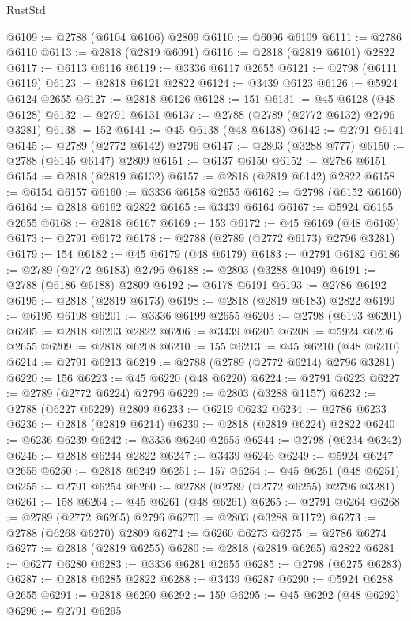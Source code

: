 \begin{lexlean}{RustStd}
\begin{coremodule}
@6109 := @2788 (@6104 @6106) @2809
@6110 := @6096 @6109
@6111 := @2786 @6110
@6113 := @2818 (@2819 @6091)
@6116 := @2818 (@2819 @6101) @2822
@6117 := @6113 @6116
@6119 := @3336 @6117 @2655
@6121 := @2798 (@6111 @6119)
@6123 := @2818 @6121 @2822
@6124 := @3439 @6123
@6126 := @5924 @6124 @2655
@6127 := @2818 @6126
@6128 := 151
@6131 := @45 @6128 (@48 @6128)
@6132 := @2791 @6131
@6137 := @2788 (@2789 (@2772 @6132) @2796 @3281)
@6138 := 152
@6141 := @45 @6138 (@48 @6138)
@6142 := @2791 @6141
@6145 := @2789 (@2772 @6142) @2796
@6147 := @2803 (@3288 @777)
@6150 := @2788 (@6145 @6147) @2809
@6151 := @6137 @6150
@6152 := @2786 @6151
@6154 := @2818 (@2819 @6132)
@6157 := @2818 (@2819 @6142) @2822
@6158 := @6154 @6157
@6160 := @3336 @6158 @2655
@6162 := @2798 (@6152 @6160)
@6164 := @2818 @6162 @2822
@6165 := @3439 @6164
@6167 := @5924 @6165 @2655
@6168 := @2818 @6167
@6169 := 153
@6172 := @45 @6169 (@48 @6169)
@6173 := @2791 @6172
@6178 := @2788 (@2789 (@2772 @6173) @2796 @3281)
@6179 := 154
@6182 := @45 @6179 (@48 @6179)
@6183 := @2791 @6182
@6186 := @2789 (@2772 @6183) @2796
@6188 := @2803 (@3288 @1049)
@6191 := @2788 (@6186 @6188) @2809
@6192 := @6178 @6191
@6193 := @2786 @6192
@6195 := @2818 (@2819 @6173)
@6198 := @2818 (@2819 @6183) @2822
@6199 := @6195 @6198
@6201 := @3336 @6199 @2655
@6203 := @2798 (@6193 @6201)
@6205 := @2818 @6203 @2822
@6206 := @3439 @6205
@6208 := @5924 @6206 @2655
@6209 := @2818 @6208
@6210 := 155
@6213 := @45 @6210 (@48 @6210)
@6214 := @2791 @6213
@6219 := @2788 (@2789 (@2772 @6214) @2796 @3281)
@6220 := 156
@6223 := @45 @6220 (@48 @6220)
@6224 := @2791 @6223
@6227 := @2789 (@2772 @6224) @2796
@6229 := @2803 (@3288 @1157)
@6232 := @2788 (@6227 @6229) @2809
@6233 := @6219 @6232
@6234 := @2786 @6233
@6236 := @2818 (@2819 @6214)
@6239 := @2818 (@2819 @6224) @2822
@6240 := @6236 @6239
@6242 := @3336 @6240 @2655
@6244 := @2798 (@6234 @6242)
@6246 := @2818 @6244 @2822
@6247 := @3439 @6246
@6249 := @5924 @6247 @2655
@6250 := @2818 @6249
@6251 := 157
@6254 := @45 @6251 (@48 @6251)
@6255 := @2791 @6254
@6260 := @2788 (@2789 (@2772 @6255) @2796 @3281)
@6261 := 158
@6264 := @45 @6261 (@48 @6261)
@6265 := @2791 @6264
@6268 := @2789 (@2772 @6265) @2796
@6270 := @2803 (@3288 @1172)
@6273 := @2788 (@6268 @6270) @2809
@6274 := @6260 @6273
@6275 := @2786 @6274
@6277 := @2818 (@2819 @6255)
@6280 := @2818 (@2819 @6265) @2822
@6281 := @6277 @6280
@6283 := @3336 @6281 @2655
@6285 := @2798 (@6275 @6283)
@6287 := @2818 @6285 @2822
@6288 := @3439 @6287
@6290 := @5924 @6288 @2655
@6291 := @2818 @6290
@6292 := 159
@6295 := @45 @6292 (@48 @6292)
@6296 := @2791 @6295

\end{coremodule}
\end{lexlean}
